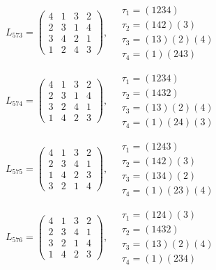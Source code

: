 $L_{573} = \begin{pmatrix} 4 & 1 & 3 & 2 \\ 2 & 3 & 1 & 4 \\ 3 & 4 & 2 & 1 \\ 1 & 2 & 4 & 3 \end{pmatrix}, \quad \begin{matrix} \tau_{1} = (1 2 3 4) \\ \tau_{2} = (1 4 2)(3) \\ \tau_{3} = (1 3)(2)(4) \\ \tau_{4} = (1)(2 4 3) \end{matrix}$

$L_{574} = \begin{pmatrix} 4 & 1 & 3 & 2 \\ 2 & 3 & 1 & 4 \\ 3 & 2 & 4 & 1 \\ 1 & 4 & 2 & 3 \end{pmatrix}, \quad \begin{matrix} \tau_{1} = (1 2 3 4) \\ \tau_{2} = (1 4 3 2) \\ \tau_{3} = (1 3)(2)(4) \\ \tau_{4} = (1)(2 4)(3) \end{matrix}$

$L_{575} = \begin{pmatrix} 4 & 1 & 3 & 2 \\ 2 & 3 & 4 & 1 \\ 1 & 4 & 2 & 3 \\ 3 & 2 & 1 & 4 \end{pmatrix}, \quad \begin{matrix} \tau_{1} = (1 2 4 3) \\ \tau_{2} = (1 4 2)(3) \\ \tau_{3} = (1 3 4)(2) \\ \tau_{4} = (1)(2 3)(4) \end{matrix}$

$L_{576} = \begin{pmatrix} 4 & 1 & 3 & 2 \\ 2 & 3 & 4 & 1 \\ 3 & 2 & 1 & 4 \\ 1 & 4 & 2 & 3 \end{pmatrix}, \quad \begin{matrix} \tau_{1} = (1 2 4)(3) \\ \tau_{2} = (1 4 3 2) \\ \tau_{3} = (1 3)(2)(4) \\ \tau_{4} = (1)(2 3 4) \end{matrix}$

